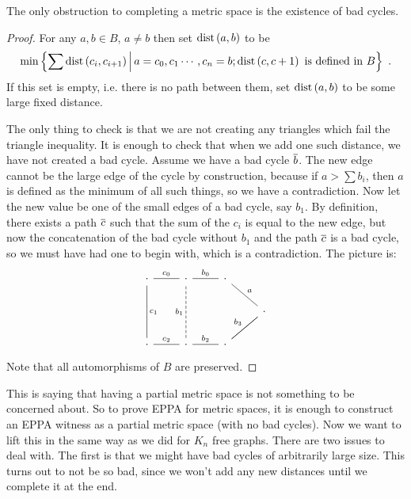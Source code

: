 \documentclass{amsart}
\begin{document}
\begin{clm}
The only obstruction to completing a metric space is the existence of bad cycles.
\end{clm}

\begin{proof}
For any $a,b\in B$, $a\neq b$ then set $\operatorname{dist}\left( a,b \right)$ to be
\begin{equation}
\min\left\{ \sum \dist\left( c_i , c_{i+1} \right) \st a = c_0 ,c_1 \cdots , c_n =
b;\dist\left( c , c+1 \right) \text{ is defined in } B\right\} \ .
\end{equation}
If this set is empty, i.e. there is no path between them, set $\operatorname{dist}\left( a,b
\right)$ to be some large fixed distance.

The only thing to check is that we are not creating any triangles which fail the triangle
inequality. It is enough to check that when we add one such distance, we have not created
a bad cycle. Assume we have a bad cycle $\overline{b}$.
The new edge cannot be the large edge of the cycle by construction, because if $a > \sum
b_i$, then $a$ is defined as the minimum of all such things, so we have a contradiction.
Now let the new value be one of the small edges of a bad cycle, say $b_1$.
By definition, there exists a path $\overline{c}$ such that the sum of the $c_i$ is equal to
the new edge, but now the concatenation of the bad cycle without $b_1$ and the path
$\overline{c}$ is a bad cycle, so we must have had one to begin with,
which is a contradiction. The picture is:
\begin{equation}
\begin{tikzcd}
\cdot \arrow[dash]{r}{c_0}\arrow[dash]{dd}{c_1} & \cdot \arrow[dash]{r}{b_0}&
\cdot\arrow[dash]{dr}{a} & \\
&&& \cdot\arrow[dash]{dl} \\ 
\cdot\arrow[dash]{r}{c_2}&\cdot \arrow[dash]{r}{b_2}\arrow[dashed,dash]{uu}{b_1}&
\cdot\arrow[dash]{ur}{b_3}
\end{tikzcd}
\end{equation}
Note that all automorphisms of $B$ are preserved.
\end{proof}

This is saying that having a partial metric space is not something to be
concerned about. So to prove EPPA for metric spaces, it is enough to construct an EPPA
witness as a partial metric space (with no bad cycles).
Now we want to lift this in the same way as we did for $K_n$ free graphs. 
There are two issues to deal with. The first is that we might have bad cycles of
arbitrarily large size. This turns out to not be so bad, since we won't add any new
distances until we complete it at the end.
\end{document}
